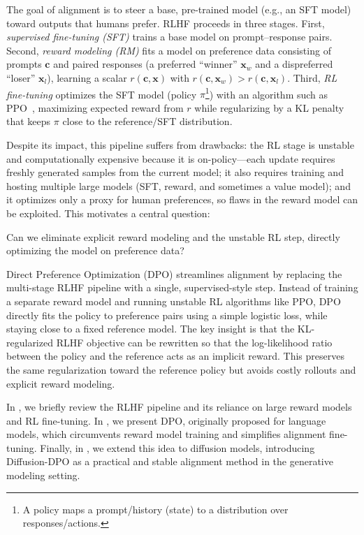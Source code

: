 The goal of alignment is to steer a base, pre-trained model (e.g., an SFT model) toward outputs that humans prefer. RLHF proceeds in three stages. First, \emph{supervised fine-tuning (SFT)} trains a base model on prompt–response pairs. Second, \emph{reward modeling (RM)} fits a model on preference data consisting of prompts $\mathbf{c}$ and paired responses (a preferred ``winner'' $\mathbf{x}_w$ and a dispreferred ``loser'' $\mathbf{x}_l$), learning a scalar $r(\mathbf{c},\mathbf{x})$ with $r(\mathbf{c},\mathbf{x}_w)>r(\mathbf{c},\mathbf{x}_l)$. Third, \emph{RL fine-tuning} optimizes the SFT model (policy $\pi$\footnote{A policy maps a prompt/history (state) to a distribution over responses/actions.}) with an algorithm such as PPO~\citep{schulman2017proximal}, maximizing expected reward from $r$ while regularizing by a KL penalty that keeps $\pi$ close to the reference/SFT distribution.

Despite its impact, this pipeline suffers from drawbacks: the RL stage is unstable and computationally expensive because it is on-policy—each update requires freshly generated samples from the current model; it also requires training and hosting multiple large models (SFT, reward, and sometimes a value model); and it optimizes only a proxy for human preferences, so flaws in the reward model can be exploited. This motivates a central question:
\begin{question}
    Can we eliminate explicit reward modeling and the unstable RL step, directly optimizing the model on preference data?
\end{question}

Direct Preference Optimization (DPO) streamlines alignment by replacing the multi-stage RLHF pipeline with a single, supervised-style step. Instead of training a separate reward model and running unstable RL algorithms like PPO, DPO directly fits the policy to preference pairs using a simple logistic loss, while staying close to a fixed reference model. The key insight is that the KL-regularized RLHF objective can be rewritten so that the log-likelihood ratio between the policy and the reference acts as an implicit reward. This preserves the same regularization toward the reference policy but avoids costly rollouts and explicit reward modeling.

In , we briefly review the RLHF pipeline and its reliance on large reward models and RL fine-tuning. In , we present DPO, originally proposed for language models, which circumvents reward model training and simplifies alignment fine-tuning. Finally, in , we extend this idea to diffusion models, introducing Diffusion-DPO as a practical and stable alignment method in the generative modeling setting.

